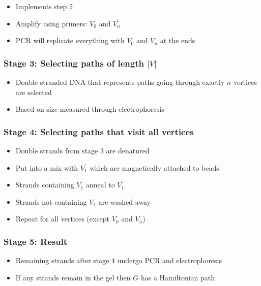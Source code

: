 \documentclass[a4paper]{article}
\begin{document}
\begin{itemize}
  \item Implements step 2
  \item Amplify using primers: $V_{0}$ and $V^{\prime}_{n}$
  \item PCR will replicate everything with $V_{0}$ and $V_{n}$ at the ends
\end{itemize}

\subsubsection{Stage 3: Selecting paths of length $|V|$}

\begin{itemize}
  \item Double stranded DNA that represents paths going through exactly $n$
        vertices are selected
  \item Based on size measured through electrophoresis
\end{itemize}

\subsubsection{Stage 4: Selecting paths that visit all vertices}

\begin{itemize}
  \item Double strands from stage 3 are denatured
  \item Put into a mix with $V^{\prime}_{1}$ which are magnetically attached to
        beads
  \item Strands containing $V_{1}$ anneal to $V^{\prime}_{1}$
  \item Strands not containing $V_{1}$ are washed away
  \item Repeat for all vertices (except $V_{0}$ and $V_{n}$)
\end{itemize}

\subsubsection{Stage 5: Result}

\begin{itemize}
  \item Remaining strands after stage 4 undergo PCR and electrophoresis
  \item If any strands remain in the gel then $G$ has a Hamiltonian path
\end{itemize}
\end{document}
